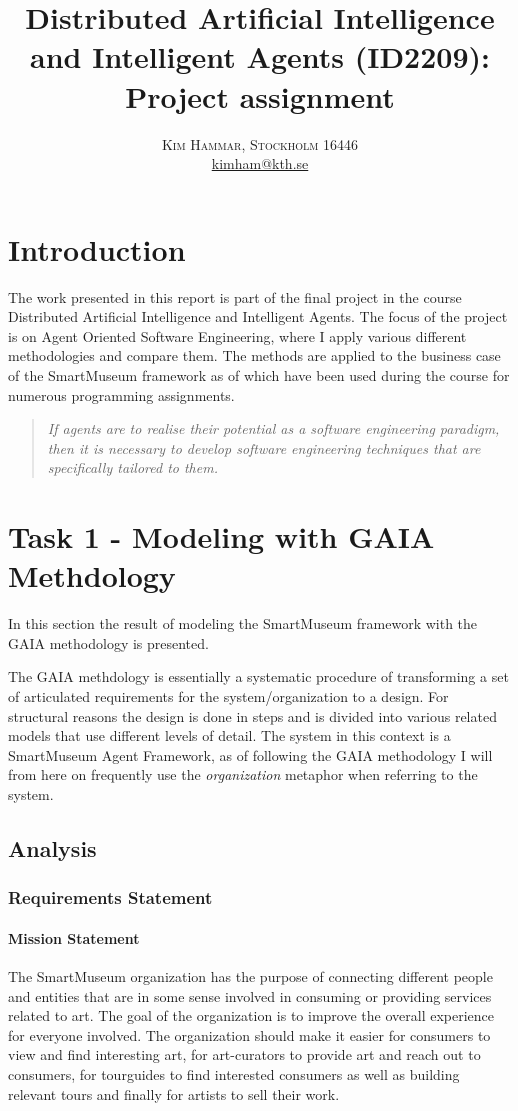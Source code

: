 \documentclass[paper=letter, fontsize=12pt]{article}
\title{\vspace{-15mm}\fontsize{24pt}{10pt}\selectfont\textbf{Distributed Artificial Intelligence and Intelligent Agents (ID2209): Project assignment}} %
\author{
\large
{\textsc{Kim Hammar, Stockholm 16446 }}\\[2mm]
\normalsize \href{mailto:kimham@kth.se}{kimham@kth.se}\\[2mm] %
}
\date{}
\begin{document}
\maketitle %
\thispagestyle{fancy} %


\section{Introduction}
The work presented in this report is part of the final project in the course Distributed Artificial Intelligence and Intelligent Agents. The focus of the project is on Agent Oriented Software Engineering, where I apply various different methodologies and compare them. The methods are applied to the business case of the SmartMuseum framework as of which have been used during the course for numerous programming assignments.

\begin{quote}
\textit{If agents are to realise their potential as a software engineering paradigm, then it is necessary to develop software engineering techniques that are specifically tailored to them.}\citep{wooldrigde_jennings}
\end{quote}
\section{Task 1 - Modeling with GAIA Methdology}
In this section the result of modeling the SmartMuseum framework with the GAIA methodology \citep{wooldrigde_jennings} is presented.

The GAIA methdology is essentially a systematic procedure of transforming a set of articulated requirements for the system/organization to a design. For structural reasons the design is done in steps and is divided into various related models that use different levels of detail. The system in this context is a SmartMuseum Agent Framework, as of following the GAIA methodology \citep{wooldrigde_jennings} I will from here on frequently use the \textit{organization} metaphor when referring to the system.
\subsection{Analysis}
\subsubsection{Requirements Statement}
\paragraph{Mission Statement}
The SmartMuseum organization has the purpose of connecting different people and entities that are in some sense involved in consuming or providing services related to art. The goal of the organization is to improve the overall experience for everyone involved. The organization should make it easier for consumers to view and find interesting art, for art-curators to provide art and reach out to consumers, for tourguides to find interested consumers as well as building relevant tours and finally for artists to sell their work.
\end{document}
